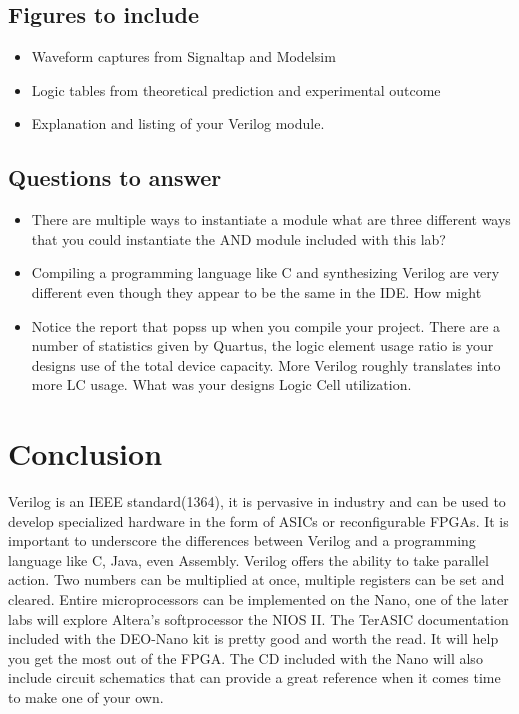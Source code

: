 \documentclass[12pt,journal]{IEEEtran}
\begin{document}
    \subsection{Figures to include}
    \begin{itemize}
      \item Waveform captures from Signaltap and Modelsim
      \item Logic tables from theoretical prediction and experimental outcome
      \item Explanation and listing of your Verilog module.
    \end{itemize}

    \subsection{Questions to answer}
    \begin{itemize}
      \item There are multiple ways to instantiate a module what are three different ways that you could
            instantiate the AND module included with this lab?
      \item Compiling a programming language like C and synthesizing Verilog are very different even though they
            appear to be the same in the IDE. How might 
      \item Notice the report that popss up when you compile your project. There are a number of statistics given
            by Quartus, the logic element usage ratio is your designs use of the total device capacity. More Verilog
            roughly translates into more LC usage. What was your designs Logic Cell utilization. 
    \end{itemize}

  \section{\bfseries  Conclusion}
    Verilog is an IEEE standard(1364)\cite{Wikipedia:Verilog}, it is pervasive in industry and can be used to develop specialized hardware
    in the form of ASICs or reconfigurable FPGAs. It is important to underscore the differences between Verilog
    and a programming language like C, Java, even Assembly. Verilog offers the ability to take parallel action.
    Two numbers can be multiplied at once, multiple registers can be set and cleared. Entire microprocessors can
    be implemented on the Nano, one of the later labs will explore Altera's softprocessor the NIOS II. The TerASIC
    documentation included with the DEO-Nano kit is pretty good and worth the read. It will help you get the most
    out of the FPGA. The CD included with the Nano will also include circuit schematics that can provide a great
    reference when it comes time to make one of your own.
\end{document}
